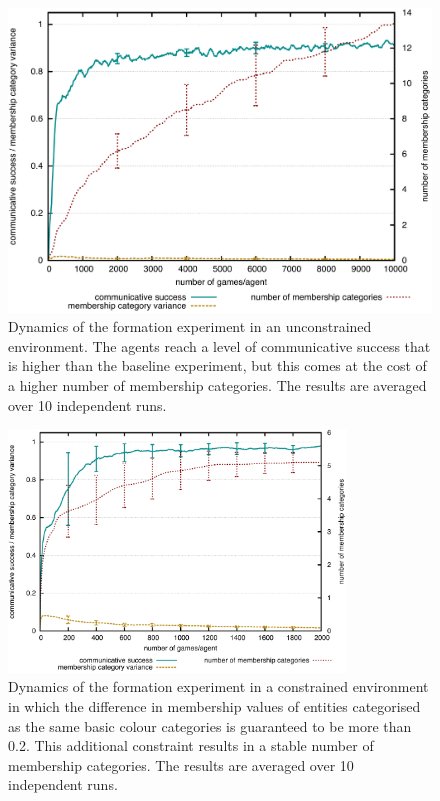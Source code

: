 \begin{figure}[htpb]
  \begin{center}
    \includegraphics[width=.8\textwidth]{./graded-membership/figures/strict-formation.pdf}
    \caption[Dynamics of the formation experiment in an unconstrained
    environment]{Dynamics of the formation experiment in an
      unconstrained environment. The agents reach a level of
      communicative success that is higher than the baseline
      experiment, but this comes at the cost of a higher number of
      membership categories. The results are averaged over 10
      independent runs.}
    \label{f:gm-formation-dynamics}
  \end{center}
\end{figure}

\begin{figure}[htpb]
  \begin{center}
    \includegraphics[width=0.8\textwidth]{./graded-membership/figures/strict-formation-constrained.pdf} %
    \caption[Dynamics of the formation experiment in a constrained
    environment]{Dynamics of the formation experiment in a
      constrained environment in which the difference in membership
      values of entities categorised as the same basic colour
      categories is guaranteed to be more than 0.2. This additional
      constraint results in a stable number of membership
      categories. The results are averaged over 10 independent runs.}
    \label{f:gm-formation-constrained-dynamics}
  \end{center}
\end{figure}

